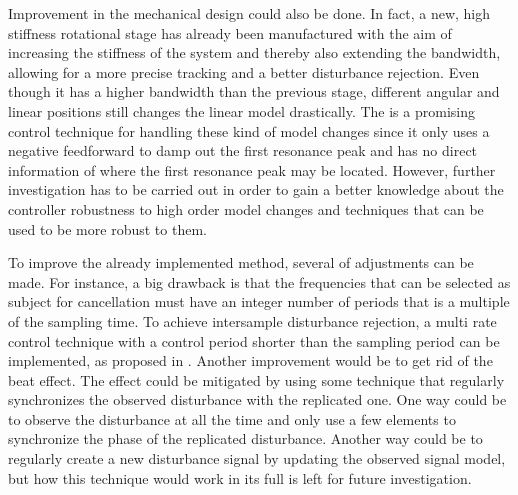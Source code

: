 Improvement in the mechanical design could also be done. In fact, a new, high stiffness rotational stage has already been manufactured with the aim of increasing the stiffness of the system and thereby also extending the bandwidth, allowing for a more precise tracking and a better disturbance rejection. Even though it has a higher bandwidth than the previous stage, different angular and linear positions still changes the linear model drastically. The \abbrIRC is a promising control technique for handling these kind of model changes since it only uses a negative feedforward to damp out the first resonance peak and has no direct information of where the first resonance peak may be located. However, further investigation has to be carried out in order to gain a better knowledge about the controller robustness to high order model changes and techniques that can be used to be more robust to them.

To improve the already implemented \abbrRFDC method, several of adjustments can be made. For instance, a big drawback is that the frequencies that can be selected as subject for cancellation must have an integer number of periods that is a multiple of the sampling time. To achieve intersample disturbance rejection, a multi rate control technique with a control period shorter than the sampling period can be implemented, as proposed in \citep{fujimoto2009rro}. Another improvement would be to get rid of the beat effect. The effect could be mitigated by using some technique that regularly synchronizes the observed disturbance with the replicated one. One way could be to observe the disturbance at all the time and only use a few elements to synchronize the phase of the replicated disturbance. Another way could be to regularly create a new disturbance signal by updating the observed signal model, but how this technique would work in its full is left for future investigation.
